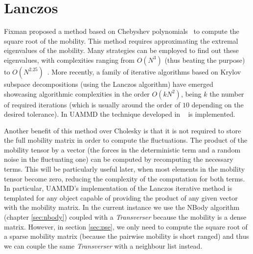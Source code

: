 \documentclass[twoside,openright,titlepage,numbers=noenddot,%
headinclude,footinclude,cleardoublepage=empty,abstract=on,
BCOR=5mm,fontsize=11pt, dvipsnames, paper=b5
]{scrreprt}
\newcommand{\uammd}{\gls{UAMMD}\xspace}
\begin{document}
\section{Lanczos}\label{sec:lanczos}
Fixman proposed a method based on Chebyshev polynomials~\cite{Fixman1986} to compute the square root of the mobility. This method requires approximating the extremal eigenvalues of the mobility. Many strategies can be employed to find out these eigenvalues, with complexities ranging from $O(N^3)$ (thus beating the purpose) to $O(N^{2.25})$~\cite{Jendrejack2000}. More recently, a family of iterative algorithms based on Krylov subspace decompositions (using the Lanczos algorithm) have emerged~\cite{Ando2012,Saadat2014} showcasing algorithmic complexities in the order $O(kN^2)$, being $k$ the number of required iterations (which is usually around the order of $10$ depending on the desired tolerance). In \uammd the technique developed in ~\cite{Ando2012} is implemented.

Another benefit of this method over Cholesky is that it is not required to store the full mobility matrix in order to compute the fluctuations. The product of the mobility tensor by a vector (the forces in the deterministic term and a random noise in the fluctuating one) can be computed by recomputing the necessary terms. This will be particularly useful later, when most elements in the mobility tensor become zero, reducing the complexity of the computation for both terms. In particular, \uammd's implementation of the Lanczos iterative method is templated for any object capable of providing the product of any given vector with the mobility matrix. In the current instance we use the NBody algorithm (chapter \ref{sec:nbody}) coupled with a \emph{Transverser} because the mobility is a dense matrix. However, in section \ref{sec:pse}, we only need to compute the square root of a sparse mobility matrix (because the pairwise mobility is short ranged) and thus we can couple the same \emph{Transverser} with a neighbour list instead.


\end{document}
